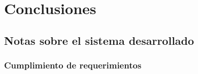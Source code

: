 
\chapter{Conclusiones} %

\label{Chapter5} %




\section{Notas sobre el sistema desarrollado }



\subsection{Cumplimiento de requerimientos}

